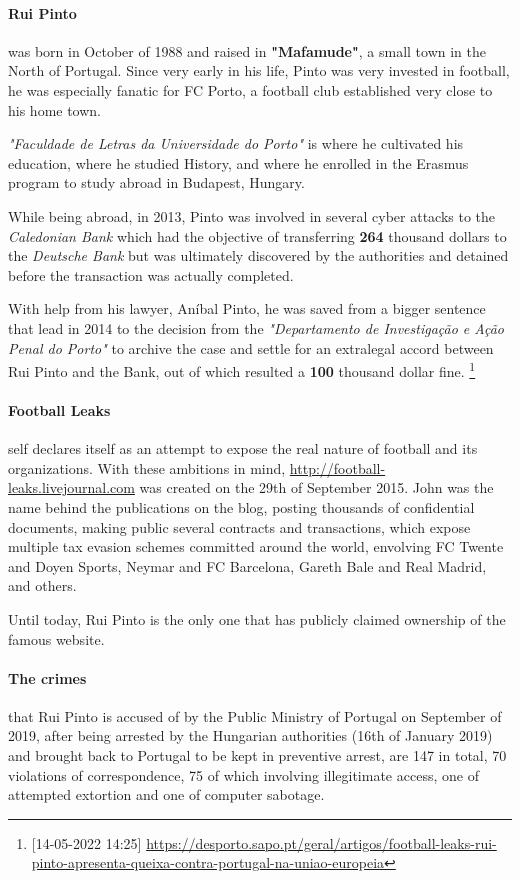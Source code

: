 \paragraph{Rui Pinto}
was born in October of 1988 and raised in \textbf{"Mafamude"}, a small town in the North of Portugal.
Since very early in his life, Pinto was very invested in football, he was especially fanatic for FC Porto, a football club established very close to his home town.

\textit{"Faculdade de Letras da Universidade do Porto"} is where he cultivated his education, where he studied History, and where he enrolled in the Erasmus program to study abroad in Budapest, Hungary.

While being abroad, in 2013, Pinto was involved in several cyber attacks to the \textit{Caledonian Bank} which had the objective of transferring \textbf{264} thousand dollars to the \textit{Deutsche Bank} but was ultimately discovered by the authorities and detained before the transaction was actually completed.

With help from his lawyer, Aníbal Pinto, he was saved from a bigger sentence that lead in 2014 to the decision from the \textit{"Departamento de Investigação e Ação Penal do Porto"} to archive the case and settle for an extralegal accord between Rui Pinto and the Bank, out of which resulted a \textbf{100} thousand dollar fine.
\footnote{[14-05-2022 14:25] \url{https://desporto.sapo.pt/geral/artigos/football-leaks-rui-pinto-apresenta-queixa-contra-portugal-na-uniao-europeia}}


\paragraph{Football Leaks} self declares itself as an attempt to expose the real nature of football and its organizations.
With these ambitions in mind, \url{http://football-leaks.livejournal.com} was created on the 29th of September 2015.
John was the name behind the publications on the blog, posting thousands of confidential documents, making public several contracts and transactions, which expose multiple tax evasion schemes committed around the world, envolving FC Twente and Doyen Sports, Neymar and FC Barcelona, Gareth Bale and Real Madrid, and others.

Until today, Rui Pinto is the only one that has publicly claimed ownership of the famous website.

\paragraph{The crimes} that Rui Pinto is accused of by the Public Ministry of Portugal on September of 2019, after being arrested by the Hungarian authorities (16th of January 2019) and brought back to Portugal to be kept in preventive arrest, are 147 in total, 70 violations of correspondence, 75 of which involving illegitimate access, one of attempted extortion and one of computer sabotage.

